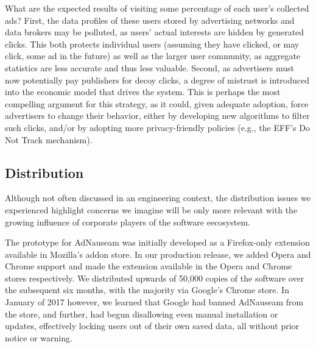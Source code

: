 \documentclass[conference]{IEEEtran}
\begin{document}
What are the expected results of visiting some percentage of each user's collected ads? First, the data profiles of these users stored by advertising networks and data brokers may be polluted, as users' actual interests are hidden by generated clicks. This both protects individual users (assuming they have clicked, or may click, some ad in the future) as well as the larger user community, as aggregate statistics are less accurate and thus less valuable. Second, as advertisers must now potentially pay publishers for decoy clicks, a degree of mistrust is introduced into the economic model that drives the system. This is perhaps the most compelling argument for this strategy, as it could, given adequate adoption, force advertisers to change their behavior, either by developing new algorithms to filter such clicks, and/or by adopting more privacy-friendly policies (e.g., the EFF's Do Not Track mechanism).

\subsection{Distribution}

Although not often discussed in an engineering context, the distribution issues we experienced highlight concerns we imagine will be only more relevant with the growing influence of corporate players of the software eecosystem.

The prototype for AdNauseam was initially developed as a Firefox-only extension available in  Mozilla's addon store. In our production release, we added Opera and Chrome support and made the extension available in the Opera and Chrome stores respectively. We distributed upwards of 50,000 copies of the software over the subsequent six months, with the majority via Google's Chrome store. In January of 2017 however, we learned that Google had banned AdNauseam from the store, and further, had begun disallowing even manual installation or updates, effectively locking users out of their own saved data, all without prior notice or warning.
\end{document}
